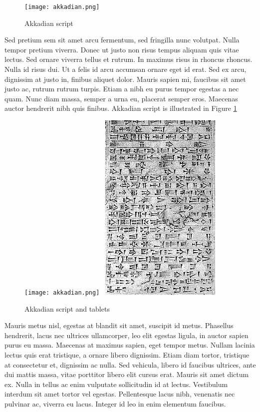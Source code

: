 \documentclass{scrartcl}
\begin{document}
\begin{figure}[h]
\texttt{[image: akkadian.png]}
\caption{Akkadian script}
\label{fig:akkadianscript}
\end{figure}

Sed pretium sem sit amet arcu fermentum, sed fringilla nunc volutpat. Nulla tempor pretium viverra. Donec ut justo non risus tempus aliquam quis vitae lectus. Sed ornare viverra tellus et rutrum. In maximus risus in rhoncus rhoncus. Nulla id risus dui. Ut a felis id arcu accumsan ornare eget id erat. Sed ex arcu, dignissim at justo in, finibus aliquet dolor. Mauris sapien mi, faucibus sit amet justo ac, rutrum rutrum turpis. Etiam a nibh eu purus tempor egestas a nec quam. Nunc diam massa, semper a urna eu, placerat semper eros. Maecenas auctor hendrerit nibh quis finibus. 
Akkadian script is illustrated in Figure \ref{fig:akkadianscript}


\begin{figure}[t]
\texttt{[image: akkadian.png]}~
\includegraphics{tablet.jpg}

\caption{Akkadian script and tablets}
\end{figure}



Mauris metus nisl, egestas at blandit sit amet, suscipit id metus. Phasellus hendrerit, lacus nec ultrices ullamcorper, leo elit egestas ligula, in auctor sapien purus eu massa. Maecenas at maximus sapien, eget tempor metus. Nullam lacinia lectus quis erat tristique, a ornare libero dignissim. Etiam diam tortor, tristique at consectetur et, dignissim ac nulla. Sed vehicula, libero id faucibus ultrices, ante dui mattis massa, vitae porttitor libero elit cursus erat. Mauris sit amet dictum ex. Nulla in tellus ac enim vulputate sollicitudin id at lectus. Vestibulum interdum sit amet tortor vel egestas. Pellentesque lacus nibh, venenatis nec pulvinar ac, viverra eu lacus. Integer id leo in enim elementum faucibus. 
\end{document}
